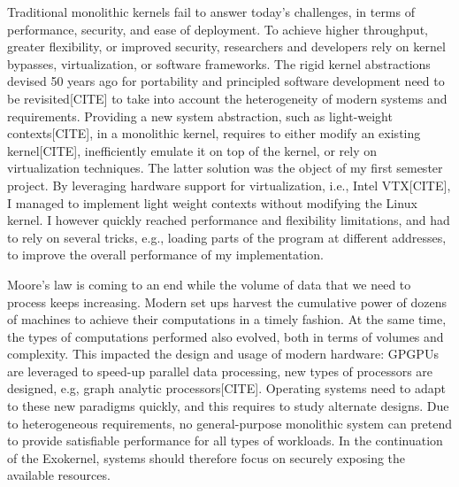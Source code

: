 Traditional monolithic kernels fail to answer today's challenges, in terms of performance, security, and ease of deployment.
To achieve higher throughput, greater flexibility, or improved security, researchers and developers rely on kernel bypasses\cite{intel2014data,intel2016storage,BelayPKGKB14}, virtualization\cite{BelayPKGKB14}, or software frameworks.
The rigid kernel abstractions devised 50 years ago for portability and principled software development need to be revisited[CITE] to take into account the heterogeneity of modern systems and requirements.
Providing a new system abstraction, such as light-weight contexts[CITE], in a monolithic kernel, requires to either modify an existing kernel[CITE], inefficiently emulate it on top of the kernel, or rely on virtualization techniques.
The latter solution was the object of my first semester project.
By leveraging hardware support for virtualization, i.e., Intel VTX[CITE], I managed to implement light weight contexts without modifying the Linux kernel.
I however quickly reached performance and flexibility limitations, and had to rely on several tricks, e.g., loading parts of the program at different addresses, to improve the overall performance of my implementation.

%
Moore's law is coming to an end while the volume of data that we need to process keeps increasing.
Modern set ups harvest the cumulative power of dozens of machines to achieve their computations in a timely fashion.
At the same time, the types of computations performed also evolved, both in terms of volumes and complexity.
This impacted the design and usage of modern hardware: GPGPUs are leveraged to speed-up parallel data processing, new types of processors are designed, e.g, graph analytic processors[CITE].
Operating systems need to adapt to these new paradigms quickly, and this requires to study alternate designs.
Due to heterogeneous requirements, no general-purpose monolithic system can pretend to provide satisfiable performance for all types of workloads.
In the continuation of the Exokernel, systems should therefore focus on securely exposing the available resources.

